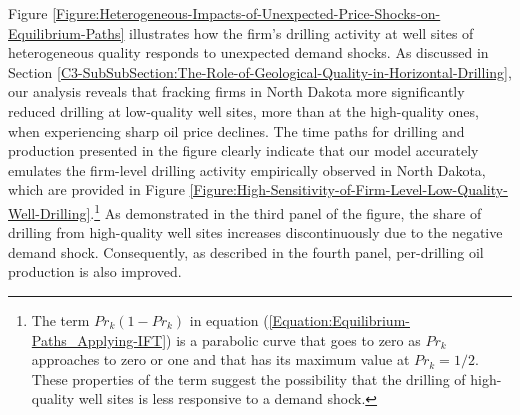 Figure \ref{Figure:Heterogeneous-Impacts-of-Unexpected-Price-Shocks-on-Equilibrium-Paths} illustrates how the firm's drilling activity at well sites of heterogeneous quality responds to unexpected demand shocks. As discussed in Section \ref{C3-SubSubSection:The-Role-of-Geological-Quality-in-Horizontal-Drilling}, our analysis reveals that fracking firms in North Dakota more significantly reduced drilling at low-quality well sites, more than at the high-quality ones, when experiencing sharp oil price declines. The time paths for drilling and production presented in the figure clearly indicate that our model accurately emulates the firm-level drilling activity empirically observed in North Dakota, which are provided in Figure \ref{Figure:High-Sensitivity-of-Firm-Level-Low-Quality-Well-Drilling}.\footnote{The term $Pr_{k}(1 - Pr_{k})$ in equation (\ref{Equation:Equilibrium-Paths_Applying-IFT}) is a parabolic curve that goes to zero as $Pr_{k}$ approaches to zero or one and that has its maximum value at $Pr_{k} = 1/2$. These properties of the term suggest the possibility that the drilling of high-quality well sites is less responsive to a demand shock.} As demonstrated in the third panel of the figure, the share of drilling from high-quality well sites increases discontinuously due to the negative demand shock. Consequently, as described in the fourth panel, per-drilling oil production is also improved. 